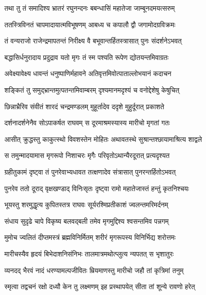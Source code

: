 
\twolineshloka
{तथा तु तं समादिश्य भ्रातरं रघुनन्दनः}
{बबन्धासिं महातेजा जाम्बूनदमयत्सरुम्} %

\twolineshloka
{ततस्त्रिविनतं चापमादायात्मविभूषणम्}
{आबध्य च कपालौ द्वौ जगामोदग्रविक्रमः} %

\twolineshloka
{तं वन्यराजो राजेन्द्रमापतन्तं निरीक्ष्य वै}
{बभूवान्तर्हितस्त्रासात् पुनः संदर्शनेऽभवत्} %

\twolineshloka
{बद्धासिर्धनुरादाय प्रदुद्राव यतो मृगः}
{तं स्म पश्यति रूपेण द्योतयन्तमिवाग्रतः} %

\twolineshloka
{अवेक्ष्यावेक्ष्य धावन्तं धनुष्पाणिर्महावने}
{अतिवृत्तमिवोत्पाताल्लोभयानं कदाचन} %

\twolineshloka
{शङ्कितं तु समुद्भ्रान्तमुत्पतन्तमिवाम्बरम्}
{दृश्यमानमदृश्यं च वनोद्देशेषु केषुचित्} %

\twolineshloka
{छिन्नाभ्रैरिव संवीतं शारदं चन्द्रमण्डलम्}
{मुहूर्तादेव ददृशे मुहुर्दूरात् प्रकाशते} %

\twolineshloka
{दर्शनादर्शनेनैव सोऽपाकर्षत राघवम्}
{स दूरमाश्रमस्यास्य मारीचो मृगतां गतः} %

\twolineshloka
{आसीत् क्रुद्धस्तु काकुत्स्थो विवशस्तेन मोहितः}
{अथावतस्थे सुश्रान्तश्छायामाश्रित्य शाद्वले} %

\twolineshloka
{स तमुन्मादयामास मृगरूपो निशाचरः}
{मृगैः परिवृतोऽथान्यैरदूरात् प्रत्यदृश्यत} %

\twolineshloka
{ग्रहीतुकामं दृष्ट्वा तं पुनरेवाभ्यधावत}
{तत्क्षणादेव संत्रासात् पुनरन्तर्हितोऽभवत्} %

\twolineshloka
{पुनरेव ततो दूराद् वृक्षखण्डाद् विनिःसृतः}
{दृष्ट्वा रामो महातेजास्तं हन्तुं कृतनिश्चयः} %

\twolineshloka
{भूयस्तु शरमुद्धृत्य कुपितस्तत्र राघवः}
{सूर्यरश्मिप्रतीकाशं ज्वलन्तमरिमर्दनम्} %

\twolineshloka
{संधाय सुदृढे चापे विकृष्य बलवद्बली}
{तमेव मृगमुद्दिश्य श्वसन्तमिव पन्नगम्} %

\twolineshloka
{मुमोच ज्वलितं दीप्तमस्त्रं ब्रह्मविनिर्मितम्}
{शरीरं मृगरूपस्य विनिर्भिद्य शरोत्तमः} %

\twolineshloka
{मारीचस्यैव हृदयं बिभेदाशनिसंनिभः}
{तालमात्रमथोत्प्लुत्य न्यपतत् स भृशातुरः} %

\twolineshloka
{व्यनदद् भैरवं नादं धरण्यामल्पजीवितः}
{म्रियमाणस्तु मारीचो जहौ तां कृत्रिमां तनुम्} %

\twolineshloka
{स्मृत्वा तद्वचनं रक्षो दध्यौ केन तु लक्ष्मणम्}
{इह प्रस्थापयेत् सीता तां शून्ये रावणो हरेत्} %

